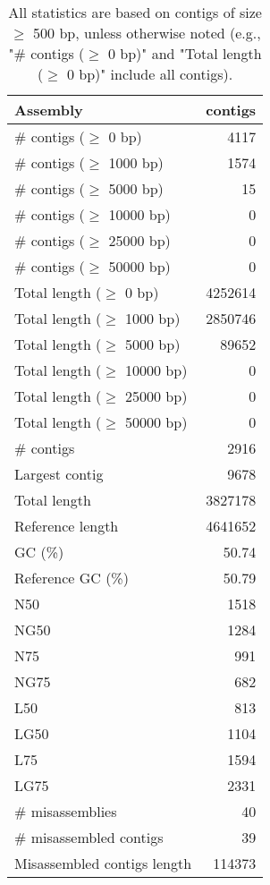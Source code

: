\documentclass[12pt,a4paper]{article}
\begin{document}
\begin{table}[ht]
\begin{center}
\caption{All statistics are based on contigs of size $\geq$ 500 bp, unless otherwise noted (e.g., "\# contigs ($\geq$ 0 bp)" and "Total length ($\geq$ 0 bp)" include all contigs).}
\begin{tabular}{|l*{1}{|r}|}
\hline
Assembly & contigs \\ \hline
\# contigs ($\geq$ 0 bp) & 4117 \\ \hline
\# contigs ($\geq$ 1000 bp) & 1574 \\ \hline
\# contigs ($\geq$ 5000 bp) & 15 \\ \hline
\# contigs ($\geq$ 10000 bp) & 0 \\ \hline
\# contigs ($\geq$ 25000 bp) & 0 \\ \hline
\# contigs ($\geq$ 50000 bp) & 0 \\ \hline
Total length ($\geq$ 0 bp) & 4252614 \\ \hline
Total length ($\geq$ 1000 bp) & 2850746 \\ \hline
Total length ($\geq$ 5000 bp) & 89652 \\ \hline
Total length ($\geq$ 10000 bp) & 0 \\ \hline
Total length ($\geq$ 25000 bp) & 0 \\ \hline
Total length ($\geq$ 50000 bp) & 0 \\ \hline
\# contigs & 2916 \\ \hline
Largest contig & 9678 \\ \hline
Total length & 3827178 \\ \hline
Reference length & 4641652 \\ \hline
GC (\%) & 50.74 \\ \hline
Reference GC (\%) & 50.79 \\ \hline
N50 & 1518 \\ \hline
NG50 & 1284 \\ \hline
N75 & 991 \\ \hline
NG75 & 682 \\ \hline
L50 & 813 \\ \hline
LG50 & 1104 \\ \hline
L75 & 1594 \\ \hline
LG75 & 2331 \\ \hline
\# misassemblies & 40 \\ \hline
\# misassembled contigs & 39 \\ \hline
Misassembled contigs length & 114373 \\ \hline

\end{tabular}
\end{center}
\end{table}
\end{document}
